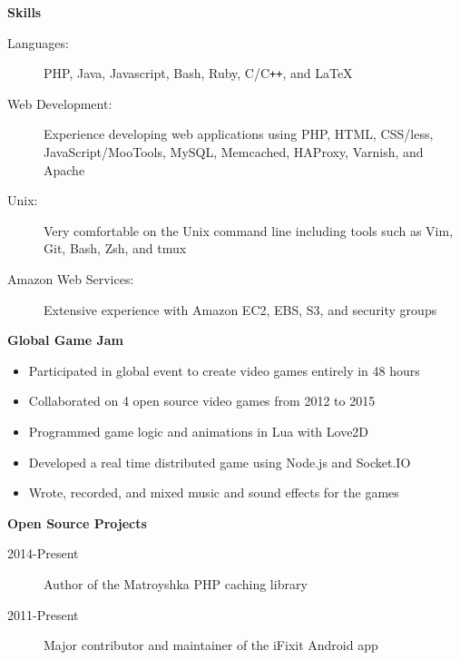\documentclass[letterpaper,11pt]{article}
\newcommand{\resitem}[1]{\item #1 \vspace{-2pt}}
\newcommand{\resheading}[1]{{\large \colorbox{mygrey}{\begin{minipage}{\textwidth}{\textbf{#1 \vphantom{p\^{E}}}}\end{minipage}}}}
\begin{document}
\resheading{Skills}

\begin{description}
\item[Languages:]
PHP, Java, Javascript, Bash, Ruby, C/C{}\verb!++!, and \LaTeX
\item[Web Development:]
Experience developing web applications using PHP, HTML, CSS/less, JavaScript/MooTools, MySQL, Memcached, HAProxy, Varnish, and Apache
\item[Unix:]
Very comfortable on the Unix command line including tools such as Vim, Git, Bash, Zsh, and tmux
\item[Amazon Web Services:]
Extensive experience with Amazon EC2, EBS, S3, and security groups
\end{description}

\resheading{Global Game Jam}

\begin{itemize}
   \resitem{Participated in global event to create video games entirely in 48 hours}
   \resitem{Collaborated on 4 open source video games from 2012 to 2015}
   \resitem{Programmed game logic and animations in Lua with Love2D}
   \resitem{Developed a real time distributed game using Node.js and Socket.IO}
   \resitem{Wrote, recorded, and mixed music and sound effects for the games}
\end{itemize}

\resheading{Open Source Projects}

\begin{description}
\item[2014-Present] Author of the Matroyshka PHP caching library
\item[2011-Present] Major contributor and maintainer of the iFixit Android app
\end{description}
\end{document}

